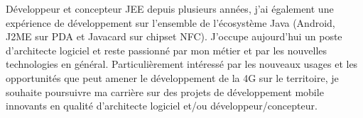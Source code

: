 \par{
	Développeur et concepteur JEE depuis plusieurs années, j'ai également une expérience de développement sur l'ensemble de l'écosystème Java (Android, J2ME sur PDA et Javacard sur chipset NFC). J'occupe aujourd'hui un poste d'architecte logiciel et reste passionné par mon métier et par les nouvelles technologies en général. Particulièrement intéressé par les nouveaux usages  et les opportunités que peut amener le développement de la 4G sur le territoire, je souhaite poursuivre ma carrière sur des projets de développement mobile innovants en qualité d'architecte logiciel et/ou développeur/concepteur.
}